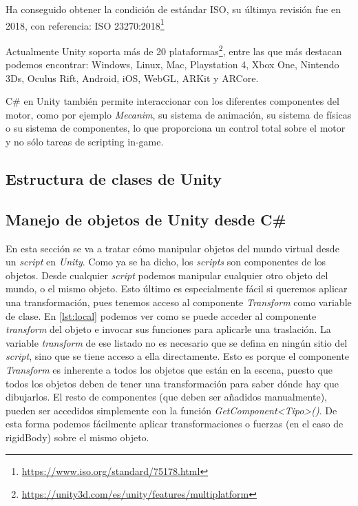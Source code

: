\documentclass{pre-tfg}
\begin{document}
Ha conseguido obtener la condición de estándar ISO, su últimya revisión fue en 2018, con referencia: ISO 23270:2018\footnote{\url{https://www.iso.org/standard/75178.html}}

Actualmente Unity soporta más de 20 plataformas\footnote{\url{https://unity3d.com/es/unity/features/multiplatform}}, entre las que más destacan podemos encontrar: Windows, Linux, Mac, Playstation 4, Xbox One, Nintendo 3Ds, Oculus Rift, Android, iOS, WebGL, ARKit y ARCore.

C\# en Unity también permite interaccionar con los diferentes componentes del motor, como por ejemplo \emph{Mecanim}, su sistema de animación, su sistema de físicas o su sistema de componentes, lo que proporciona un control total sobre el motor y no sólo tareas de scripting in-game.

\subsection{Estructura de clases de Unity}

\subsection{Manejo de objetos de Unity desde C\#}

En esta sección se va a tratar c\'omo manipular objetos del mundo virtual desde un \textit{script} en \textit{Unity}. Como ya se ha dicho, los \textit{scripts} son componentes de los objetos. Desde cualquier \textit{script} podemos manipular cualquier otro objeto del mundo, o el mismo objeto. Esto último es especialmente f\'acil si queremos aplicar una transformación, pues tenemos acceso al componente \textit{Transform} como variable de clase. En \ref{lst:local} podemos ver como se puede acceder al componente \textit{transform} del objeto e invocar sus funciones para aplicarle una traslación. La variable \textit{transform} de ese listado no es necesario que se defina en ningún sitio del \textit{script}, sino que se tiene acceso a ella directamente. Esto es porque el componente \textit{Transform} es inherente a todos los objetos que están en la escena, puesto que todos los objetos deben de tener una transformación para saber dónde hay que dibujarlos. El resto de componentes (que deben ser añadidos manualmente), pueden ser accedidos simplemente con la función \textit{GetComponent<Tipo>()}. De esta forma podemos fácilmente aplicar transformaciones o fuerzas (en el caso de rigidBody) sobre el mismo objeto.
\end{document}
